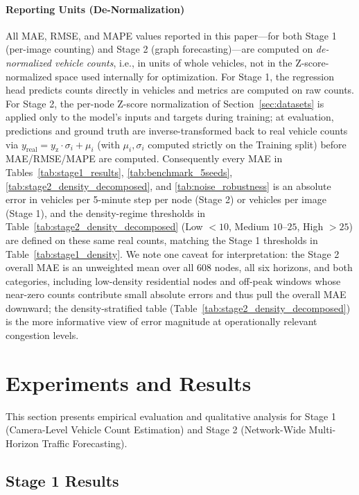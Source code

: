 \documentclass[a4paper,fleqn]{cas-sc}
\begin{document}
\paragraph{Reporting Units (De-Normalization)}
All MAE, RMSE, and MAPE values reported in this paper---for both Stage 1 (per-image counting) and Stage 2 (graph forecasting)---are computed on \emph{de-normalized vehicle counts}, i.e., in units of whole vehicles, not in the Z-score-normalized space used internally for optimization. For Stage 1, the regression head predicts counts directly in vehicles and metrics are computed on raw counts. For Stage 2, the per-node Z-score normalization of Section~\ref{sec:datasets} is applied only to the model's inputs and targets during training; at evaluation, predictions and ground truth are inverse-transformed back to real vehicle counts via $y_{\text{real}} = y_{\text{z}} \cdot \sigma_i + \mu_i$ (with $\mu_i, \sigma_i$ computed strictly on the Training split) before MAE/RMSE/MAPE are computed. Consequently every MAE in Tables~\ref{tab:stage1_results}, \ref{tab:benchmark_5seeds}, \ref{tab:stage2_density_decomposed}, and \ref{tab:noise_robustness} is an absolute error in vehicles per 5-minute step per node (Stage 2) or vehicles per image (Stage 1), and the density-regime thresholds in Table~\ref{tab:stage2_density_decomposed} (Low $<10$, Medium $10$--$25$, High $>25$) are defined on these same real counts, matching the Stage 1 thresholds in Table~\ref{tab:stage1_density}. We note one caveat for interpretation: the Stage 2 overall MAE is an unweighted mean over all $608$ nodes, all six horizons, and both categories, including low-density residential nodes and off-peak windows whose near-zero counts contribute small absolute errors and thus pull the overall MAE downward; the density-stratified table (Table~\ref{tab:stage2_density_decomposed}) is the more informative view of error magnitude at operationally relevant congestion levels.

\section{Experiments and Results}
\label{sec:results}

This section presents empirical evaluation and qualitative analysis for Stage 1 (Camera-Level Vehicle Count Estimation) and Stage 2 (Network-Wide Multi-Horizon Traffic Forecasting).

\subsection{Stage 1 Results}
\end{document}
